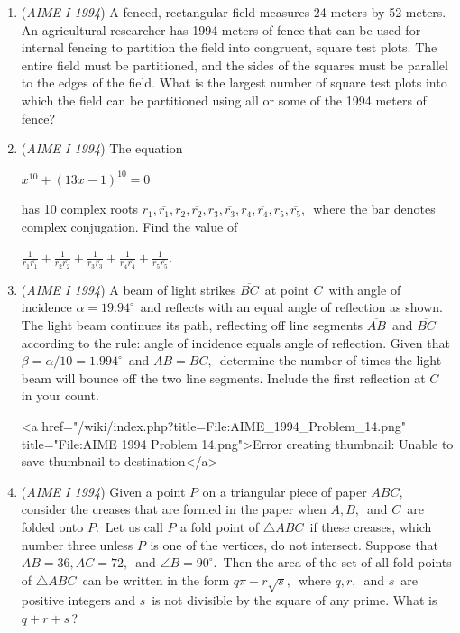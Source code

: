 \begin{enumerate}
 

	\item (\textit{AIME I 1994}) A fenced, rectangular field measures 24 meters by 52 meters. An agricultural researcher has 1994 meters of fence that can be used for internal fencing to partition the field into congruent, square test plots. The entire field must be partitioned, and the sides of the squares must be parallel to the edges of the field. What is the largest number of square test plots into which the field can be partitioned using all or some of the 1994 meters of fence? 


 

	\item (\textit{AIME I 1994}) The equation


 $x^{10}+(13x-1)^{10}=0\,$

 has 10 complex roots $r_1, \overline{r_1}, r_2, \overline{r_2}, r_3, \overline{r_3}, r_4, \overline{r_4}, r_5, \overline{r_5},\,$ where the bar denotes complex conjugation.  Find the value of


 $\frac 1{r_1\overline{r_1}}+\frac 1{r_2\overline{r_2}}+\frac 1{r_3\overline{r_3}}+\frac 1{r_4\overline{r_4}}+\frac 1{r_5\overline{r_5}}.$


	\item (\textit{AIME I 1994}) A beam of light strikes $\overline{BC}\,$ at point $C\,$ with angle of incidence $\alpha=19.94^\circ\,$ and reflects with an equal angle of reflection as shown.  The light beam continues its path, reflecting off line segments $\overline{AB}\,$ and $\overline{BC}\,$ according to the rule: angle of incidence equals angle of reflection.  Given that $\beta=\alpha/10=1.994^\circ\,$ and $AB=BC,\,$ determine the number of times the light beam will bounce off the two line segments.  Include the first reflection at $C\,$ in your count.


 <a href="/wiki/index.php?title=File:AIME\_1994\_Problem\_14.png" title="File:AIME 1994 Problem 14.png">Error creating thumbnail: Unable to save thumbnail to destination</a>


	\item (\textit{AIME I 1994}) Given a point $P^{}_{}$ on a triangular piece of paper $ABC,\,$ consider the creases that are formed in the paper when $A, B,\,$ and $C\,$ are folded onto $P.\,$  Let us call $P_{}^{}$ a fold point of $\triangle ABC\,$ if these creases, which number three unless $P^{}_{}$ is one of the vertices, do not intersect.  Suppose that $AB=36, AC=72,\,$ and $\angle B=90^\circ.\,$  Then the area of the set of all fold points of $\triangle ABC\,$ can be written in the form $q\pi-r\sqrt{s},\,$ where $q, r,\,$ and $s\,$ are positive integers and $s\,$ is not divisible by the square of any prime.  What is $q+r+s\,$?


 

\end{enumerate}